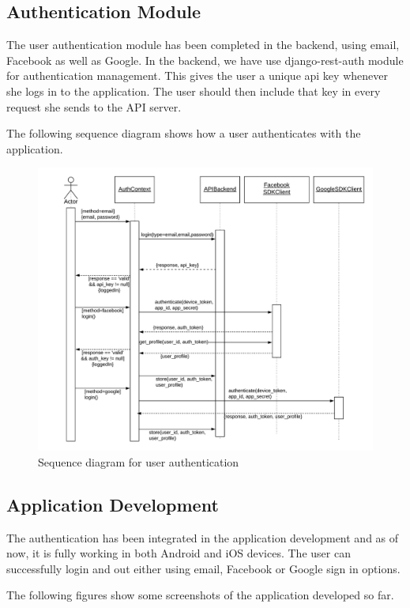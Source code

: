 \documentclass[12pt, a4paper, oneside]{article}
\begin{document}
\subsection{Authentication Module}
The user authentication module has been completed in the backend, using email, Facebook as well as Google. In the backend, we have use django-rest-auth module for authentication management. This gives the user a unique api key whenever she logs in to the application. The user should then include that key in every request she sends to the API server.

The following sequence diagram shows how a user authenticates with the application.

\begin{figure}[H]
\includegraphics[width=\linewidth, keepaspectratio]{sequence-diagrams/auth.png}
\centering
\caption{Sequence diagram for user authentication}
\label{fig:auth-sequence}
\end{figure}

\subsection{Application Development}
The authentication has been integrated in the application development and as of now, it is fully working in both Android and iOS devices. The user can successfully login and out either using email, Facebook or Google sign in options.

The following figures show some screenshots of the application developed so far.
\end{document}

